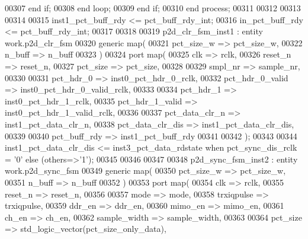 \begin{DoxyCode}
00307          \textcolor{keywordflow}{end} \textcolor{keywordflow}{if};
00308       \textcolor{keywordflow}{end} \textcolor{keywordflow}{loop};
00309    \textcolor{keywordflow}{end} \textcolor{keywordflow}{if};
00310 \textcolor{keywordflow}{end} \textcolor{keywordflow}{process};
00311 
00312 
00313 
00314 
00315 inst1\_pct\_buff\_rdy   <= pct\_buff\_rdy\_int;
00316 \textcolor{vhdlchar}{in_pct_buff_rdy}      \textcolor{vhdlchar}{<=} \textcolor{vhdlchar}{pct_buff_rdy_int};
00317 
00318 
00319 p2d\_clr\_fsm\_inst1 : \textcolor{keywordflow}{entity} work.p2d_clr_fsm
00320    \textcolor{keywordflow}{generic} \textcolor{keywordflow}{map}(
00321       pct_size_w           =>  pct_size_w,
00322       n_buff               =>  n_buff
00323    \textcolor{vhdlchar}{)}
00324    \textcolor{keywordflow}{port} \textcolor{keywordflow}{map}(
00325       clk                  => rclk,
00326       reset_n              => reset_n,
00327       pct_size             => pct_size, 
00328       
00329       smpl_nr              => sample_nr,
00330       
00331       pct_hdr_0            => inst0_pct_hdr_0_rclk,
00332       pct_hdr_0_valid      => inst0_pct_hdr_0_valid_rclk,
00333 
00334       pct_hdr_1            => inst0_pct_hdr_1_rclk,
00335       pct_hdr_1_valid      => inst0_pct_hdr_1_valid_rclk,
00336 
00337       pct_data_clr_n       => inst1_pct_data_clr_n,
00338       pct_data_clr_dis     => inst1_pct_data_clr_dis,
00339         
00340       pct_buff_rdy         => inst1_pct_buff_rdy
00341       
00342         \textcolor{vhdlchar}{)};
00343         
00344 inst1\_pct\_data\_clr\_dis <= inst3\_pct\_data\_rdstate \textcolor{keywordflow}{when} pct\_sync\_dis\_rclk = '0' \textcolor{keywordflow}{else} (others=>'1');
00345         
00346         
00347         
00348 p2d\_sync\_fsm\_inst2 : \textcolor{keywordflow}{entity} work.p2d_sync_fsm
00349    \textcolor{keywordflow}{generic} \textcolor{keywordflow}{map}(
00350       pct_size_w           =>  pct_size_w,
00351       n_buff               =>  n_buff
00352    \textcolor{vhdlchar}{)}
00353    \textcolor{keywordflow}{port} \textcolor{keywordflow}{map}(
00354       clk                  => rclk,
00355       reset_n              => reset_n,
00356       
00357       mode                 => mode, 
00358       trxiqpulse           => trxiqpulse,   
00359       ddr_en                 => ddr_en,
00360       mimo_en                => mimo_en,    
00361       ch_en                  => ch_en,
00362       sample_width         => sample_width, 
00363       
00364       pct_size             => \textcolor{comment}{std\_logic\_vector}\textcolor{vhdlchar}{(}pct_size_only_data\textcolor{vhdlchar}{)},

\end{DoxyCode}
